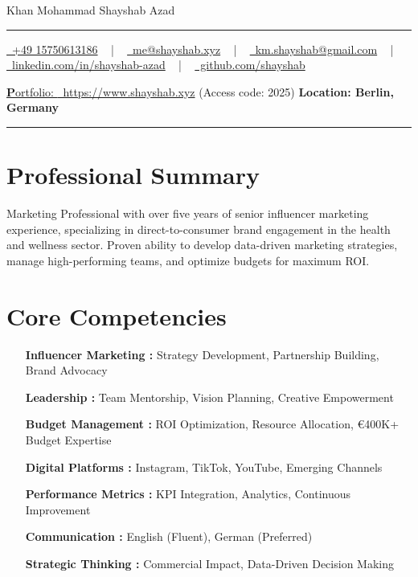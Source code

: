 \documentclass[letterpaper,10pt]{article}
\newcommand{\documentTitle}[2]{
  \begin{center}
    {\Huge\color{accentTitle} #1}
    \vspace{10pt}
    {\color{accentLine} \hrule}
    \vspace{2pt}
    \footnotesize{#2}
    \vspace{2pt}
    {\color{accentLine} \hrule}
  \end{center}
}
\begin{document}
\documentTitle{Khan Mohammad Shayshab Azad}{
  \href{tel:+49 15750613186}{
    \raisebox{-0.05\height} \faPhone\ +49 15750613186} ~ | ~
    \href{mailto:km.shayshab@gmail.com}{
    \raisebox{-0.15\height} \faEnvelope\ me@shayshab.xyz} ~ | ~
  \href{mailto:me@shayshab.xyz}{
    \raisebox{-0.15\height} \faEnvelope\ km.shayshab@gmail.com} ~ | ~
  \href{https://linkedin.com/in/shayshab-azad/}{
    \raisebox{-0.15\height} \faLinkedin\ linkedin.com/in/shayshab-azad} ~ | ~
  \href { https://github.com/shayshab}{
    \raisebox{-0.15\height} \faGithub \ github.com/shayshab} 
  
    \href{https://www.shayshab.xyz/}{
    \raisebox{-0.15\height} {\textbf Portfolio: }\ https://www.shayshab.xyz}{ (Access code: 2025)}
  \textbf{ Location: Berlin, Germany}
}

\section*{Professional Summary}
Marketing Professional with over five years of senior influencer marketing experience, specializing in direct-to-consumer brand engagement in the health and wellness sector. Proven ability to develop data-driven marketing strategies, manage high-performing teams, and optimize budgets for maximum ROI.

\section{Core Competencies}
\begin{itemize}[itemsep=-2px, parsep=1pt, leftmargin=120 pt]
  \item[\textbf{Influencer Marketing :}] Strategy Development, Partnership Building, Brand Advocacy
  \item[\textbf{Leadership :}] Team Mentorship, Vision Planning, Creative Empowerment
  \item[\textbf{Budget Management :}] ROI Optimization, Resource Allocation, €400K+ Budget Expertise
  \item[\textbf{Digital Platforms :}] Instagram, TikTok, YouTube, Emerging Channels
  \item[\textbf{Performance Metrics :}] KPI Integration, Analytics, Continuous Improvement
  \item[\textbf{Communication :}] English (Fluent), German (Preferred)
  \item[\textbf{Strategic Thinking :}] Commercial Impact, Data-Driven Decision Making
\end{itemize}
\end{document}
